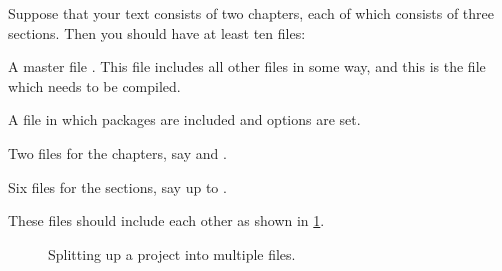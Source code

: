 Suppose that your text consists of two chapters, each of which consists of three sections.
Then you should have at least ten files:
\begin{myitemize}
  \item
    A master file .
    This file includes all other files in some way, and this is the file which needs to be compiled.
  \item
    A file  in which packages are included and options are set.
  \item
    Two files for the chapters, say  and .
  \item
    Six files for the sections, say  up to .
\end{myitemize}
These files should include each other as shown in \cref{file inclusion structure}.
\begin{figure}[tb]
  \begin{center}
  \end{center}
  \caption{Splitting up a project into multiple files.}
  \label{file inclusion structure}
\end{figure}

